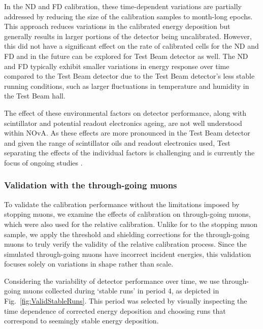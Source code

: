 In the \gls{ND} and \gls{FD} calibration, these time-dependent variations are partially addressed by reducing the size of the calibration samples to month-long epochs. This approach reduces variations in the calibrated energy deposition but generally results in larger portions of the detector being uncalibrated. However, this did not have a significant effect on the rate of calibrated cells for the \gls{ND} and \gls{FD} \cite{NOvA-doc-60838} and in the future can be explored for Test Beam detector as well. The \gls{ND} and \gls{FD} typically exhibit smaller variations in energy response over time compared to the Test Beam detector due to the Test Beam detector's less stable running conditions, such as larger fluctuations in temperature and humidity in the Test Beam hall.

The effect of these environmental factors on detector performance, along with scintillator and potential readout electronics ageing, are not well understood within \gls{NOvA}. As these effects are more pronounced in the Test Beam detector and given the range of scintillator oils and readout electronics used, Test separating the effects of the individual factors is challenging and is currently the focus of ongoing studies \cite{NOvA-doc-59591}.

\subsubsection{Validation with the through-going muons}
To validate the calibration performance without the limitations imposed by stopping muons, we examine the effects of calibration on through-going muons, which were also used for the relative calibration. Unlike for to the stopping muon sample, we apply the threshold and shielding corrections for the through-going muons to truly verify the validity of the relative calibration process. Since the simulated through-going muons have incorrect incident energies, this validation focuses solely on variations in shape rather than scale.

Considering the variability of detector performance over time, we use through-going muons collected during `stable runs' in period 4, as depicted in Fig.~\ref{fig:ValidStableRuns}. This period was selected by visually inspecting the time dependence of corrected energy deposition and choosing runs that correspond to seemingly stable energy deposition.


